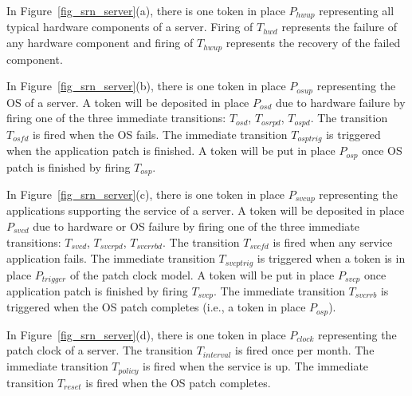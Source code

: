 \documentclass[conference]{IEEEtran}
\begin{document}
In Figure~\ref{fig_srn_server}(a), there is one token in place $P_{\mathit{hwup}}$ representing all typical hardware components of a server. Firing of $T_{\mathit{hwd}}$ represents the failure of any hardware component and firing of $T_{\mathit{hwup}}$ represents the recovery of the failed component. 

In Figure~\ref{fig_srn_server}(b), there is one token in place $P_{\mathit{osup}}$ representing the OS of a server. A token will be deposited in place $P_{\mathit{osd}}$ due to hardware failure by firing one of the three immediate transitions: $T_{\mathit{osd}}$, $T_{\mathit{osrpd}}$, $T_{\mathit{ospd}}$. The transition $T_{\mathit{osfd}}$ is fired when the OS fails. The immediate transition $T_{\mathit{osptrig}}$ is triggered when the application patch is finished. A token will be put in place $P_{\mathit{osp}}$ once OS patch is finished by firing $T_{\mathit{osp}}$.

In Figure~\ref{fig_srn_server}(c), there is one token in place $P_{\mathit{svcup}}$ representing the applications supporting the service of a server. A token will be deposited in place $P_{\mathit{svcd}}$ due to hardware or OS failure by firing one of the three immediate transitions: $T_{\mathit{svcd}}$, $T_{\mathit{svcrpd}}$, $T_{\mathit{svcrrbd}}$. The transition $T_{\mathit{svcfd}}$ is fired when any service application fails. The immediate transition $T_{\mathit{svcptrig}}$ is triggered when a token is in place $P_{\mathit{trigger}}$ of the patch clock model. A token will be put in place $P_{\mathit{svcp}}$ once application patch is finished by firing $T_{\mathit{svcp}}$. The immediate transition $T_{\mathit{svcrrb}}$ is triggered when the OS patch completes (i.e., a token in place $P_{\mathit{osp}}$).

In Figure~\ref{fig_srn_server}(d), there is one token in place $P_{\mathit{clock}}$ representing the patch clock of a server. The transition $T_{\mathit{interval}}$ is fired once per month. The immediate transition $T_{\mathit{policy}}$ is fired when the service is up. The immediate transition $T_{\mathit{reset}}$ is fired when the OS patch completes.
\end{document}
